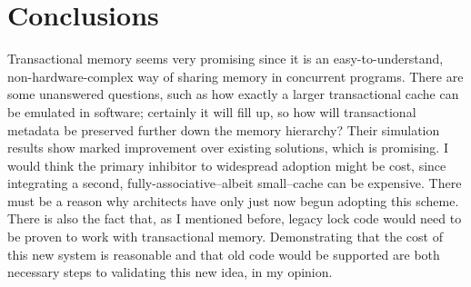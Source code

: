 \documentclass{article}
\begin{document}
\section*{Conclusions}
Transactional memory seems very promising since it is an easy-to-understand, non-hardware-complex way of sharing memory in concurrent programs. There are some unanswered questions, such as how exactly a larger transactional cache can be emulated in software; certainly it will fill up, so how will transactional metadata be preserved further down the memory hierarchy? Their simulation results show marked improvement over existing solutions, which is promising. I would
think the primary inhibitor to widespread adoption might be cost, since integrating a second, fully-associative--albeit small--cache can be expensive. There must be a reason why architects have only just now begun adopting this scheme. There is also the fact that, as I mentioned before, legacy lock code would need to be proven to work with transactional memory. Demonstrating that the cost of this new system is reasonable and that old code would be supported are both necessary steps to
validating this new idea, in my opinion. 





\end{document}
